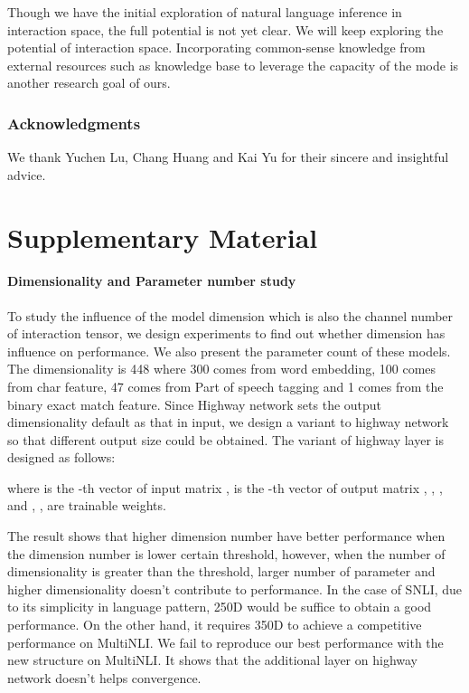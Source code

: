 \documentclass{article} \usepackage{iclr2018_conference,times}
\begin{document}
Though we have the initial exploration of natural language inference in interaction space, the full potential is not yet clear. We will keep exploring the potential of interaction space. Incorporating common-sense knowledge from external resources such as knowledge base to leverage the capacity of the mode is another research goal of ours.







\subsubsection*{Acknowledgments}
We thank Yuchen Lu, Chang Huang and Kai Yu for their sincere and insightful advice.







\appendix

\section{Supplementary Material}
\paragraph{Dimensionality and Parameter number study}
To study the influence of the model dimension  which is also the channel number of interaction tensor, we design experiments to find out whether dimension has influence on performance. We also present the parameter count of these models. The dimensionality is 448 where 300 comes from word embedding, 100 comes from char feature, 47 comes from Part of speech tagging and 1 comes from the binary exact match feature. Since Highway network sets the output dimensionality default as that in input, we design a variant to highway network so that different output size could be obtained. The variant of highway layer is designed as follows: 

where  is the -th vector of input matrix ,  is the -th vector of output matrix , , ,  and , ,  are trainable weights. 

The result shows that higher dimension number have better performance when the dimension number is lower certain threshold, however, when the number of dimensionality is greater than the threshold, larger number of parameter and higher dimensionality doesn't contribute to performance. In the case of SNLI, due to its simplicity in language pattern, 250D would be suffice to obtain a good performance. On the other hand, it requires 350D to achieve a competitive performance on MultiNLI. We fail to reproduce our best performance with the new structure on MultiNLI. It shows that the additional layer on highway network doesn't helps convergence.
\end{document}
